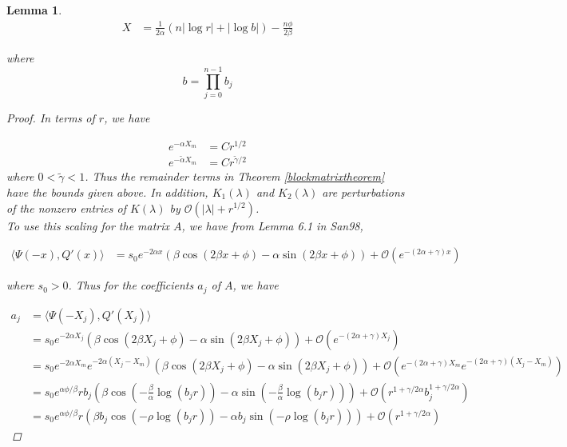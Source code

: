 \documentclass[12pt]{article}
\newtheorem{lemma}{Lemma}
\begin{document}
\begin{lemma}
\begin{align}\label{Xscaled}
X &= \frac{1}{2\alpha} (n |\log r| + |\log b| ) - \frac{n \phi}{2 \beta}
\end{align}

where 
\begin{equation}\label{defb}
b = \prod_{j=0}^{n-1} b_j
\end{equation}

\begin{proof}
In terms of $r$, we have

\begin{align*}
e^{-\alpha X_m} &= C r^{1/2} \\
e^{-\tilde{\alpha} X_m} &= C r^{\tilde{\gamma}/2}
\end{align*}
where $0 < \tilde{\gamma} < 1$. Thus the remainder terms in Theorem \ref{blockmatrixtheorem} have the bounds given above. In addition, $K_1(\lambda)$ and $K_2(\lambda)$ are perturbations of the nonzero entries of $K(\lambda)$ by $\mathcal{O}(|\lambda| + r^{1/2})$.\\

To use this scaling for the matrix $A$, we have from Lemma 6.1 in San98,

\begin{align}
\langle \Psi(-x), Q'(x) \rangle
&= s_0 e^{-2 \alpha x}\left( \beta \cos(2 \beta x + \phi) - \alpha \sin(2 \beta x + \phi)\right) + \mathcal{O}(e^{-(2 \alpha + \gamma) x}) \label{IPpsiQprime}
\end{align}

where $s_0 > 0$. Thus for the coefficients $a_j$ of $A$, we have

\begin{align*}
a_j &= \langle \Psi(-X_j), Q'(X_j) \rangle \\
&= s_0 e^{-2 \alpha X_j}\left( \beta \cos(2 \beta X_j + \phi) - \alpha \sin(2 \beta X_j + \phi)\right) + \mathcal{O}(e^{-(2 \alpha + \gamma) X_j}) \\
&= s_0 e^{-2 \alpha X_m} e^{-2 \alpha (X_j - X_m)} \left( \beta \cos(2 \beta X_j + \phi) - \alpha \sin(2 \beta X_j + \phi)\right) + \mathcal{O}(e^{-(2 \alpha + \gamma) X_m} e^{-(2 \alpha + \gamma) (X_j - X_m) }) \\
&= s_0 e^{\alpha \phi/\beta} r b_j \left( \beta \cos\left( -\frac{\beta}{\alpha} \log(b_j r) \right) - \alpha \sin \left( -\frac{\beta}{\alpha} \log(b_j r) \right) \right) + \mathcal{O}(r^{1+\gamma/2\alpha} b_j^{1 + \gamma/2\alpha}) \\
&= s_0 e^{\alpha \phi/\beta} r \left( \beta b_j \cos\left( -\rho \log(b_j r) \right) - \alpha b_j \sin \left( -\rho \log(b_j r) \right) \right) + \mathcal{O}(r^{1+\gamma/2\alpha})
\end{align*}


\end{proof}
\end{lemma}
\end{document}
